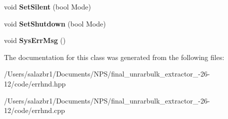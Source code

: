 \begin{DoxyCompactItemize}
\item 
\hypertarget{class_error_handler_aa2d17e2b29bc34a506b1c120774b584c}{void {\bfseries Set\-Silent} (bool Mode)}\label{class_error_handler_aa2d17e2b29bc34a506b1c120774b584c}

\item 
\hypertarget{class_error_handler_a150129e132207aaeedb1c0918526138e}{void {\bfseries Set\-Shutdown} (bool Mode)}\label{class_error_handler_a150129e132207aaeedb1c0918526138e}

\item 
\hypertarget{class_error_handler_a4c79a149a5fd10ed3989c20ac501c1d9}{void {\bfseries Sys\-Err\-Msg} ()}\label{class_error_handler_a4c79a149a5fd10ed3989c20ac501c1d9}

\end{DoxyCompactItemize}


The documentation for this class was generated from the following files\-:\begin{DoxyCompactItemize}
\item 
/\-Users/salazbr1/\-Documents/\-N\-P\-S/final\-\_\-unrarbulk\-\_\-extractor\-\_-\/26-\/12/code/errhnd.\-hpp\item 
/\-Users/salazbr1/\-Documents/\-N\-P\-S/final\-\_\-unrarbulk\-\_\-extractor\-\_-\/26-\/12/code/errhnd.\-cpp\end{DoxyCompactItemize}
